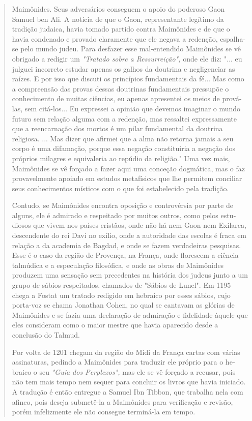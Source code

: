 \begin{quote}
Maimônides. Seus adversários conseguem o apoio do poderoso Gaon Samuel
ben Ali. A notícia de que o Gaon, representante legítimo da tradição
judaica, havia tomado partido contra Maimônides e de que o havia
condenado e prova­do claramente que ele negava a redenção, espalha-se
pelo mundo judeu. Para desfazer esse mal-entendido Maimônides se vê
obrigado a redigir um \emph{"Tratado sobre a Ressurreição",} onde ele
diz: "... eu julguei incorreto estudar apenas os galhos da doutrina e
negligenciar as raízes. E por isso que discuti os princí­pios
fundamentais da fé... Mas como a compreensão das provas dessas
doutri­nas fundamentais pressupõe o conhecimento de muitas ciências, eu
apenas apre­sentei os meios de prová-las, sem citá-los... Eu expressei a
opinião que deve­mos imaginar o mundo futuro sem relação alguma com a
redenção, mas ressal­tei expressamente que a reencarnação dos mortos é
um pilar fundamental da doutrina religiosa. ... Mas dizer que afirmei
que a alma não retorna jamais a seu corpo é uma difamação, porque essa
negação constituiria a negação dos pró­prios milagres e equivaleria ao
repúdio da religião." Uma vez mais, Maimôni­des se vê forçado a fazer
aqui uma conceção dogmática, mas o faz provavel­mente apoiado em estudos
metafísicos que lhe permitem conciliar seus conhe­cimentos místicos com
o que foi estabelecido pela tradição.

Contudo, se Maimônides encontra oposição e controvérsia por par­te de
alguns, ele é admirado e respeitado por muitos outros, como pelos
estu­diosos que vivem nos países cristãos, onde não há nem Gaon nem
Exilarca, descendente do rei Davi no exílio, onde a autoridade das
escolas é fraca em relação a da academia de Bagdad, e onde se fazem
verdadeiras pesquisas. Esse é o caso da região de Provença, na França,
onde florescem a ciência talmúdica e a especulação filosófica, e onde as
obras de Maimônides produzem uma sen­sação sem precedentes na história
dos judeus junto a um grupo de sábios res­peitados, chamados de "Sábios
de Lunel". Em 1195 chega a Fostat um tratado redigido em hebraico por
esses sábios, cujo porta-voz se chama Jonathan Co­hen, no qual se
cantavam as glórias de Maimônides e se fazia uma declaração de admiração
e fidelidade àquele que eles consideram como o maior mestre que havia
aparecido desde a conclusão do Talmud.

Por volta de 1201 chegam da região do Midi da França cartas com várias
assinaturas, pedindo a Maimônides para traduzir ele próprio para o
he­braico o seu \emph{"Guia dos Perplexos",} mas ele se vê forçado a
recusar, pois não tem mais tempo nem sequer para concluir os livros que
havia iniciado. A tradu­ção é então entregue a Samuel Ibn Tibbon, que
trabalha nela com afinco, pois deseja submetê-la a Maimônides para
verificação e revisão, porém infelizmente ele não consegue terminá-la em
tempo.


\end{quote}
